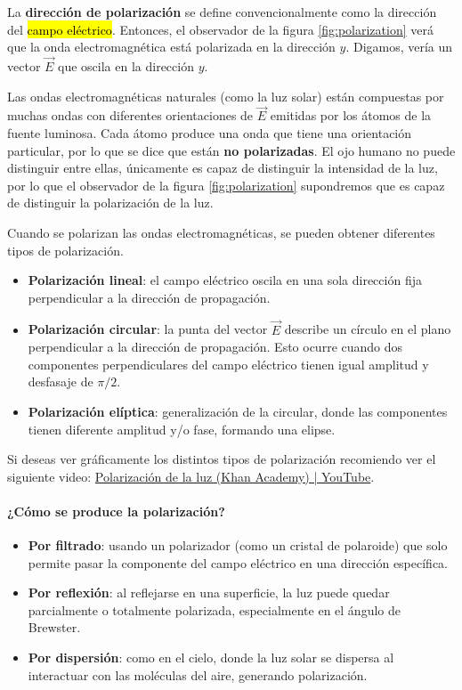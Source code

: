 La \textbf{dirección de polarización} se define convencionalmente como la dirección del \hl{campo eléctrico}. Entonces, el observador de la figura \ref{fig:polarization} verá que la onda electromagnética está polarizada en la dirección \(y\). Digamos, vería un vector \(\vec{E}\) que oscila en la dirección \(y\).

Las ondas electromagnéticas naturales (como la luz solar) están compuestas por muchas ondas con diferentes orientaciones de \(\vec{E}\) emitidas por los átomos de la fuente luminosa. Cada átomo produce una onda que tiene una orientación particular, por lo que se dice que están \textbf{no polarizadas}. El ojo humano no puede distinguir entre ellas, únicamente es capaz de distinguir la intensidad de la luz, por lo que el observador de la figura \ref{fig:polarization} supondremos que es capaz de distinguir la polarización de la luz.

Cuando se polarizan las ondas electromagnéticas, se pueden obtener diferentes tipos de polarización.
\begin{itemize}
  \item \textbf{Polarización lineal}: el campo eléctrico oscila en una sola dirección fija perpendicular a la dirección de propagación.
  \item \textbf{Polarización circular}: la punta del vector \(\vec{E}\) describe un círculo en el plano perpendicular a la dirección de propagación. Esto ocurre cuando dos componentes perpendiculares del campo eléctrico tienen igual amplitud y desfasaje de \(\pi/2\).
  \item \textbf{Polarización elíptica}: generalización de la circular, donde las componentes tienen diferente amplitud y/o fase, formando una elipse.
\end{itemize}
Si deseas ver gráficamente los distintos tipos de polarización recomiendo ver el siguiente video: \href{https://www.youtube.com/watch?v=PMjADwpLlfs}{Polarización de la luz (Khan Academy) | YouTube}.

\paragraph{¿Cómo se produce la polarización?}
\begin{itemize}
  \item \textbf{Por filtrado}: usando un polarizador (como un cristal de polaroide) que solo permite pasar la componente del campo eléctrico en una dirección específica.
  \item \textbf{Por reflexión}: al reflejarse en una superficie, la luz puede quedar parcialmente o totalmente polarizada, especialmente en el ángulo de Brewster.
  \item \textbf{Por dispersión}: como en el cielo, donde la luz solar se dispersa al interactuar con las moléculas del aire, generando polarización.
\end{itemize}

